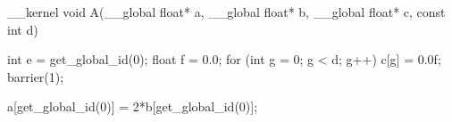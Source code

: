 __kernel void A(__global float* a,
__global float* b,
__global float* c,
const int d) {
int e = get_global_id(0);
float f = 0.0;
for (int g = 0; g < d; g++) {
c[g] = 0.0f;
}
barrier(1);

a[get_global_id(0)] = 2*b[get_global_id(0)];
}
